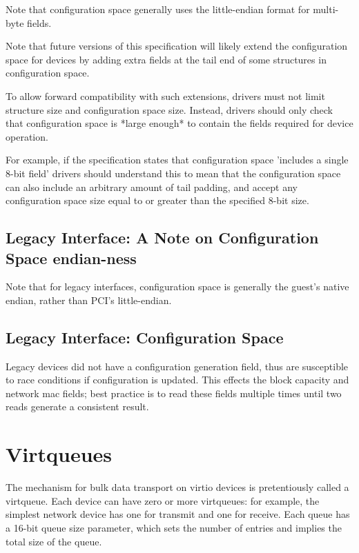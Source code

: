 Note that configuration space generally uses the little-endian format
for multi-byte fields.

Note that future versions of this specification will likely
extend the configuration space for devices by adding extra fields
at the tail end of some structures in configuration space.

To allow forward compatibility with such extensions, drivers must
not limit structure size and configuration space size.  Instead,
drivers should only check that configuration space is *large enough* to
contain the fields required for device operation.

For example, if the specification states that configuration
space 'includes a single 8-bit field' drivers should understand this to mean that
the configuration space can also include an arbitrary amount of
tail padding, and accept any configuration space size equal to or
greater than the specified 8-bit size.

\subsection{Legacy Interface: A Note on Configuration Space endian-ness}\label{sec:Basic Facilities of a Virtio Device / Configuration Space / Legacy Interface: A Note on Configuration Space endian-ness}

Note that for legacy interfaces, configuration space is generally the
guest's native endian, rather than PCI's little-endian.

\subsection{Legacy Interface: Configuration Space}\label{sec:Basic Facilities of a Virtio Device / Configuration Space / Legacy Interface: Configuration Space}

Legacy devices did not have a configuration generation field, thus are
susceptible to race conditions if configuration is updated.  This
effects the block capacity and network mac fields; best practice is to
read these fields multiple times until two reads generate a consistent
result.

\section{Virtqueues}\label{sec:Basic Facilities of a Virtio Device / Virtqueues}

The mechanism for bulk data transport on virtio devices is
pretentiously called a virtqueue. Each device can have zero or more
virtqueues: for example, the simplest network device has one for
transmit and one for receive.  Each queue has a 16-bit queue size
parameter, which sets the number of entries and implies the total size
of the queue.

